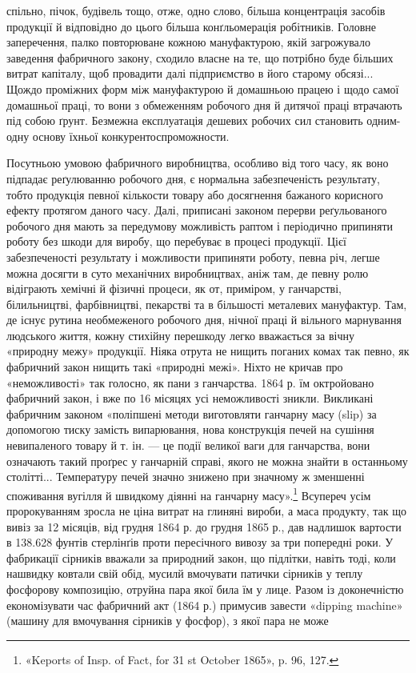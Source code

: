 \parcont{}  %
спільно, пічок, будівель тощо, отже, одно слово, більша концентрація
засобів продукції й відповідно до цього більша конґльомерація
робітників. Головне заперечення, палко повторюване
кожною мануфактурою, якій загрожувало заведення фабричного
закону, сходило власне на те, що потрібно буде більших витрат
капіталу, щоб провадити далі підприємство в його старому обсязі...
Щождо проміжних форм між мануфактурою й домашньою працею
і щодо самої домашньої праці, то вони з обмеженням робочого
дня й дитячої праці втрачають під собою ґрунт. Безмежна експлуатація
дешевих робочих сил становить одним-одну основу їхньої
конкурентоспроможности.

Посутньою умовою фабричного виробництва, особливо від того
часу, як воно підпадає реґулюванню робочого дня, є нормальна
забезпеченість результату, тобто продукція певної кількости товару
або досягнення бажаного корисного ефекту протягом даного
часу. Далі, приписані законом перерви реґульованого робочого
дня мають за передумову можливість раптом і періодично припиняти
роботу без шкоди для виробу, що перебуває в процесі продукції.
Цієї забезпеченості результату і можливости припиняти
роботу, певна річ, легше можна досягти в суто механічних виробництвах,
аніж там, де певну ролю відіграють хемічні й фізичні
процеси, як от, приміром, у ганчарстві, білильництві, фарбівництві,
пекарстві та в більшості металевих мануфактур. Там, де
існує рутина необмеженого робочого дня, нічної праці й вільного
марнування людського життя, кожну стихійну перешкоду легко
вважається за вічну «природну межу» продукції. Ніяка отрута
не нищить поганих комах так певно, як фабричний закон нищить
такі «природні межі». Ніхто не кричав про «неможливості» так
голосно, як пани з ганчарства. 1864 р. їм октройовано фабричний
закон, і вже по 16 місяцях усі неможливості зникли. Викликані
фабричним законом «поліпшені методи виготовляти ганчарну
масу (slip) за допомогою тиску замість випарювання, нова конструкція
печей на сушіння невипаленого товару й т. ін. — це
події великої ваги для ганчарства, вони означають такий проґрес
у ганчарній справі, якого не можна знайти в останньому столітті...
Температуру печей значно знижено при значному ж зменшенні
споживання вугілля й швидкому діянні на ганчарну масу».\footnote{
«Keports of Insp. of Fact, for 31 st October 1865», p. 96, 127.
}
Всупереч усім пророкуванням зросла не ціна витрат на глиняні
вироби, а маса продукту, так що вивіз за 12 місяців, від грудня
1864 р. до грудня 1865 р., дав надлишок вартости в 138.628 фунтів
стерлінґів проти пересічного вивозу за три попередні роки. У фабрикації
сірників вважали за природний закон, що підлітки,
навіть тоді, коли нашвидку ковтали свій обід, мусилй вмочувати
патички сірників у теплу фосфорову композицію, отруйна пара
якої била їм у лице. Разом із доконечністю економізувати час
фабричний акт (1864 р.) примусив завести «dipping machine»
(машину для вмочування сірників у фосфор), з якої пара не може
\parbreak{}  %
